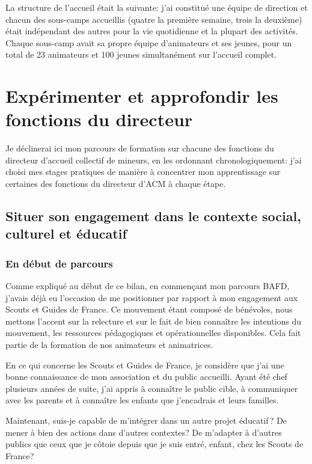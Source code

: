 \documentclass[titlepage,11pt,a4paper]{article}
\begin{document}
La structure de l'accueil était la suivante: j'ai constitué une équipe de
direction et chacun des sous-camps accueillis (quatre la première semaine, trois la deuxième)
était indépendant des autres pour la vie quotidienne et la plupart des activités.
Chaque sous-camp avait sa propre équipe d'animateurs et ses jeunes, pour un total de 23
animateurs et 100 jeunes simultanément sur l'accueil complet.

\section{Expérimenter et approfondir les fonctions du directeur}

Je déclinerai ici mon parcours de formation sur chacune des fonctions du directeur
d'accueil collectif de mineurs, en les ordonnant chronologiquement: j'ai choisi mes stages
pratiques de manière à concentrer mon apprentissage sur certaines des fonctions du directeur d’ACM à
chaque étape.

\subsection{Situer son engagement dans le contexte social, culturel et éducatif}
\subsubsection{En début de parcours}

Comme expliqué au début de ce bilan, en commençant mon parcours BAFD, j'avais déjà eu
l'occasion de me positionner par rapport à mon engagement aux Scouts et Guides de France.
Ce mouvement étant composé de bénévoles, nous mettons l'accent sur la relecture et sur le
fait de bien connaître les intentions du mouvement, les ressources pédagogiques et
opérationnelles disponibles. Cela fait partie de la formation de nos animateurs et
animatrices.

En ce qui concerne les Scouts et Guides de France, je considère que j'ai une bonne
connaissance de mon association et du public accueilli.
Ayant été chef plusieurs années de suite, j'ai appris à connaître le public cible, à
communiquer avec les parents et à connaître les enfants que j'encadrais et leurs familles.

Maintenant, suis-je capable de m'intégrer dans un autre projet éducatif\,? De mener à bien
des actions dans d'autres contextes? De m'adapter à d'autres publics que ceux que je
côtoie depuis que je suis entré, enfant, chez les Scouts de France?
\end{document}
